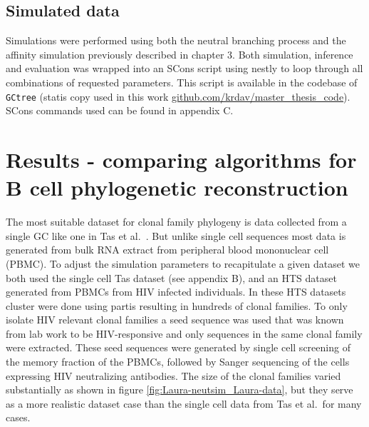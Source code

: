 \subsection{Simulated data}
Simulations were performed using both the neutral branching process and the affinity simulation previously described in chapter 3.
Both simulation, inference and evaluation was wrapped into an SCons script \cite{fomel2007reproducible} using nestly \cite{mccoy2012nestly} to loop through all combinations of requested parameters.
This script is available in the codebase of \texttt{GCtree} (statis copy used in this work \url{github.com/krdav/master_thesis_code}).
SCons commands used can be found in appendix C.





\section{Results - comparing algorithms for B cell phylogenetic reconstruction}
The most suitable dataset for clonal family phylogeny is data collected from a single GC like one in Tas et al.\ \cite{tas2016visualizing}.
But unlike single cell sequences most data is generated from bulk RNA extract from peripheral blood mononuclear cell (PBMC).
To adjust the simulation parameters to recapitulate a given dataset we both used the single cell Tas dataset (see appendix B), and an HTS dataset generated from PBMCs from HIV infected individuals.
In these HTS datasets cluster were done using partis resulting in hundreds of clonal families.
To only isolate HIV relevant clonal families a seed sequence was used that was known from lab work to be HIV-responsive and only sequences in the same clonal family were extracted.
These seed sequences were generated by single cell screening of the memory fraction of the PBMCs, followed by Sanger sequencing of the cells expressing HIV neutralizing antibodies.
The size of the clonal families varied substantially as shown in figure \ref{fig:Laura-neutsim_Laura-data}, but they serve as a more realistic dataset case than the single cell data from Tas et al.\ for many cases.

